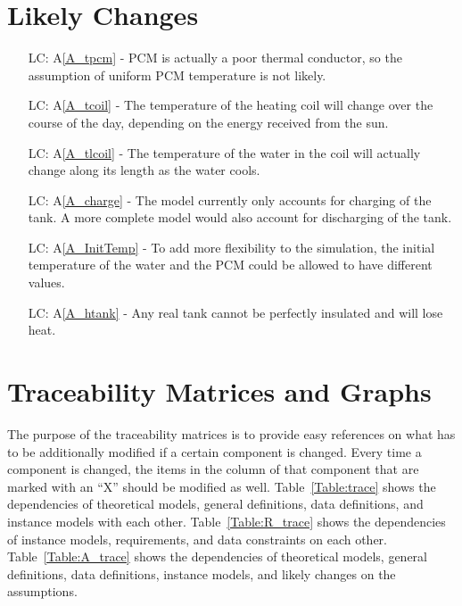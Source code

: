 \documentclass[12pt]{article}
\newcommand{\aref}[1]{A\ref{#1}}
\newcounter{lcnum} %
\begin{document}
\section{Likely Changes}    

\noindent \begin{itemize}

\item[LC\refstepcounter{lcnum}\thelcnum\label{LC_tpcm}:]\aref{A_tpcm} - PCM is
  actually a poor thermal conductor, so the assumption of uniform PCM
  temperature is not likely.

\item[LC\refstepcounter{lcnum}\thelcnum \label{LC_tcoil}:]\aref{A_tcoil} - The
  temperature of the heating coil will change over the course of the day,
  depending on the energy received from the sun.

\item[LC\refstepcounter{lcnum}\thelcnum \label{LC_tlcoil}:]\aref{A_tlcoil} - The
  temperature of the water in the coil will actually change along its length as
  the water cools.

\item[LC\refstepcounter{lcnum}\thelcnum \label{LC_charge}:]\aref{A_charge} - The
  model currently only accounts for charging of the tank.  A more complete model
  would also account for discharging of the tank.

\item[LC\refstepcounter{lcnum}\thelcnum \label{LC_InitTemp}:]\aref{A_InitTemp} - To
  add more flexibility to the simulation, the initial temperature of the water
  and the PCM could be allowed to have different values.

\item[LC\refstepcounter{lcnum}\thelcnum \label{LC_htank}:]\aref{A_htank} - Any
  real tank cannot be perfectly insulated and will lose heat.

\end{itemize}

\section{Traceability Matrices and Graphs}
The purpose of the traceability matrices is to provide easy references on what has to be additionally modified if a certain component is changed.  Every time a 
component is changed, the items in the column of that component that are 
marked with an ``X'' should be modified as well.  Table~\ref{Table:trace}
shows the dependencies of theoretical models, general definitions, data
definitions, and instance models with each other. Table~\ref{Table:R_trace} shows
the dependencies of instance models, requirements, and data constraints on each other. Table~\ref{Table:A_trace} shows the dependencies of theoretical models, general definitions, data definitions,  instance models, and likely changes on the assumptions.
\end{document}
